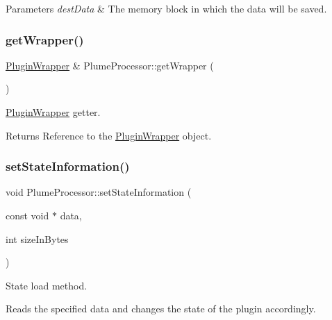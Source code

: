 \begin{DoxyParams}{Parameters}
{\em dest\+Data} & The memory block in which the data will be saved. \\
\hline
\end{DoxyParams}
\mbox{\label{class_plume_processor_a6ec4d89f181beea78034b81911c59aa8}} 
\subsubsection{\texorpdfstring{get\+Wrapper()}{getWrapper()}}
{\footnotesize\ttfamily \mbox{\hyperlink{class_plugin_wrapper}{Plugin\+Wrapper}} \& Plume\+Processor\+::get\+Wrapper (\begin{DoxyParamCaption}{ }\end{DoxyParamCaption})}



\mbox{\hyperlink{class_plugin_wrapper}{Plugin\+Wrapper}} getter. 

\begin{DoxyReturn}{Returns}
Reference to the \mbox{\hyperlink{class_plugin_wrapper}{Plugin\+Wrapper}} object. 
\end{DoxyReturn}
\mbox{\label{class_plume_processor_aa7ab9da73c37f6db69ea6c7e1e4a0211}} 
\subsubsection{\texorpdfstring{set\+State\+Information()}{setStateInformation()}}
{\footnotesize\ttfamily void Plume\+Processor\+::set\+State\+Information (\begin{DoxyParamCaption}\item[{const void $\ast$}]{data,  }\item[{int}]{size\+In\+Bytes }\end{DoxyParamCaption})\hspace{0.3cm}{\ttfamily [override]}}



State load method. 

Reads the specified data and changes the state of the plugin accordingly.


